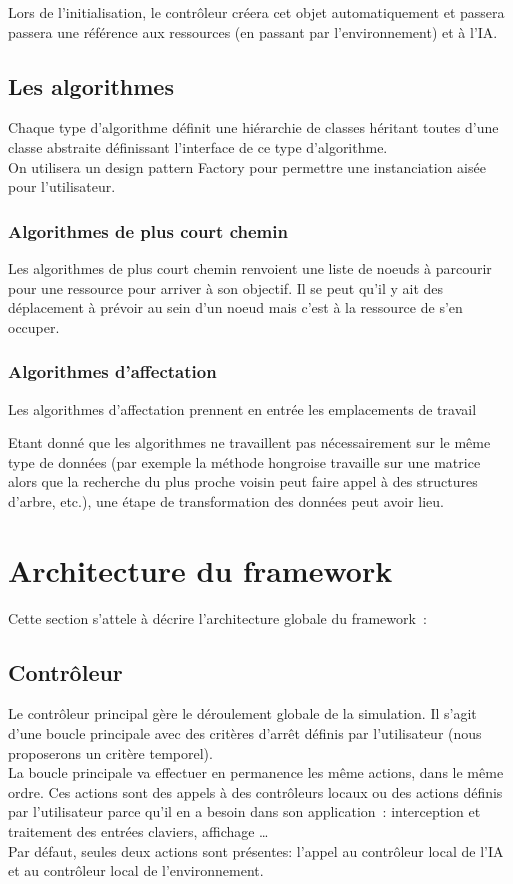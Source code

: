 Lors de l'initialisation, le contrôleur créera cet objet automatiquement et passera passera une référence aux ressources (en passant par l'environnement) et à l'IA.

\subsection{Les algorithmes}
Chaque type d'algorithme définit une hiérarchie de classes héritant toutes d'une classe abstraite définissant l'interface de ce type d'algorithme.\\
On utilisera un design pattern Factory pour permettre une instanciation aisée pour l'utilisateur.

\subsubsection{Algorithmes de plus court chemin}

Les algorithmes de plus court chemin renvoient une liste de noeuds à parcourir pour une ressource pour arriver à son objectif. Il se peut qu'il y ait des déplacement à prévoir au sein d'un noeud mais c'est à la ressource de s'en occuper.

\subsubsection{Algorithmes d'affectation}

Les algorithmes d'affectation prennent en entrée les emplacements de travail 

Etant donné que les algorithmes ne travaillent pas nécessairement sur le même type de données (par exemple la méthode hongroise travaille sur une matrice alors que la recherche du plus proche voisin peut faire appel à des structures d'arbre, etc.), une étape de transformation des données peut avoir lieu.

\section{Architecture du framework}

Cette section s'attele à décrire l'architecture globale du framework~:

\subsection{Contrôleur}

Le contrôleur principal gère le déroulement globale de la simulation. Il s'agit d'une boucle principale avec des critères d'arrêt définis par l'utilisateur (nous proposerons un critère temporel).\\
\indent La boucle principale va effectuer en permanence les même actions, dans le même ordre. Ces actions sont des appels à des contrôleurs locaux ou des actions définis par l'utilisateur parce qu'il en a besoin dans son application~: interception et traitement des entrées claviers, affichage \ldots \\
\indent Par défaut, seules deux actions sont présentes: l'appel au contrôleur local de l'IA et au contrôleur local de l'environnement.\\

